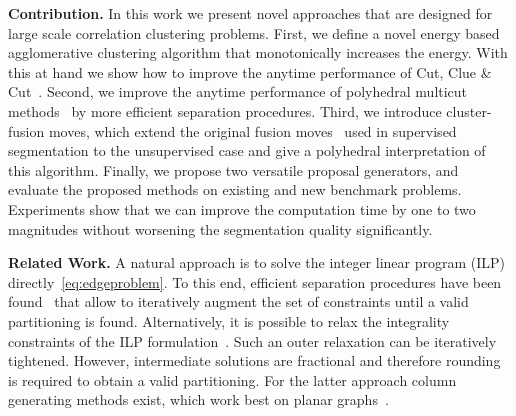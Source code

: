 \vspace{0.1cm}
\noindent \textbf{Contribution.}
In this work we present novel approaches that are designed for large scale correlation clustering problems.
First, we define a novel energy based agglomerative clustering algorithm that monotonically increases the energy.
With this at hand we show how to improve the anytime performance of Cut, Clue \& Cut~\cite{beier_2014_cvpr}.
%
Second, we improve the anytime performance of polyhedral multicut methods~\cite{kappes_2013_arxiv} by more efficient separation procedures.
%
Third, we introduce cluster-fusion moves, which extend the original fusion moves~\cite{Lempitsky-2010} 
used in supervised segmentation to the unsupervised case and give a polyhedral interpretation of this algorithm.
Finally, we propose two versatile proposal generators, and evaluate the proposed methods on existing and new benchmark problems.
Experiments show that we can improve the computation time by one to two magnitudes without worsening the segmentation 
quality significantly.
 
\vspace{0.1cm}
\noindent \textbf{Related Work.}
A natural approach is to solve the integer linear program (ILP) directly~\ref{eq:edgeproblem}. 
To this end, efficient separation procedures have been found~\cite{kappes_2011_emmcvpr,kappes_2013_arxiv} that allow to iteratively augment the set of constraints until a valid partitioning is found. 
Alternatively, it is possible to relax the integrality constraints of the ILP formulation~\cite{kappes_2013_arxiv}. 
Such an outer relaxation can be iteratively tightened. However, intermediate solutions are fractional and therefore rounding is required to obtain a valid partitioning.
For the latter approach column generating methods exist, which work best on planar graphs~\cite{yarkony_2012_eccv}. %

